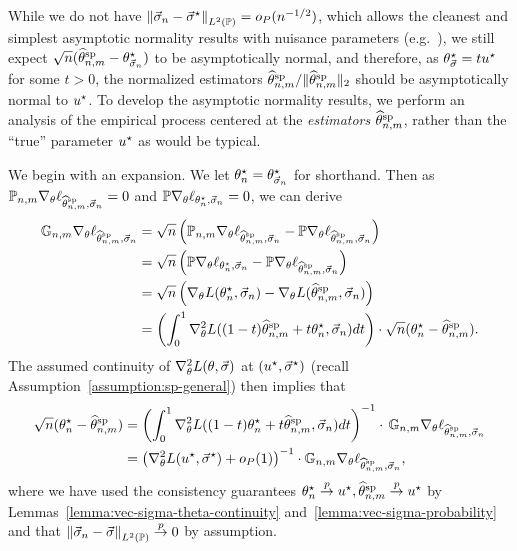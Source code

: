 While we do not have $\left\|{\vec{\sigma}_n - \vec{\sigma}^\star}\right\|_{L^2(\mathbb{P})} =
o_P(n^{-1/2})$, which allows the cleanest and simplest asymptotic normality
results with nuisance parameters
(e.g.~\cite[Thm.~25.54]{VanDerVaart98}), we still expect
$\sqrt{n}(\widehat{\theta}^{\textup{sp}}_{n,m} - \theta^\star_{\vec{\sigma}_n})$ to be asymptotically
normal, and therefore, as $\theta^\star_{\vec{\sigma}} = t u^\star$ for some
$t > 0$, the normalized estimators $\widehat{\theta}^{\textup{sp}}_{n,m} / \|{\widehat{\theta}^{\textup{sp}}_{n,m}}\|_2$
should be asymptotically normal to $u^\star$.
To develop the asymptotic normality results, we perform an analysis
of the empirical process centered at the \emph{estimators}
$\widehat{\theta}^{\textup{sp}}_{n,m}$, rather than the ``true'' parameter $u^\star$ as would
be typical.

We begin with an expansion. We let $\theta^\star_n =
\theta^\star_{\vec{\sigma}_n}$ for shorthand.
Then as $\mathbb{P}_{n,m} \nabla_\theta \ell_{\widehat{\theta}^{\textup{sp}}_{n,m},
	\vec{\sigma}_n} = 0$ and $\mathbb{P} \nabla_\theta \ell_{\theta^\star_n,
	\vec{\sigma}_n} = 0$, we can derive
\begin{align*}
	\mathbb{G}_{n,m} \nabla_\theta\ell_{\widehat{\theta}^{\textup{sp}}_{n,m}, \vec{\sigma}_n} & = \sqrt{n} \left({\mathbb{P}_{n,m} \nabla_\theta \ell_{\widehat{\theta}^{\textup{sp}}_{n,m}, \vec{\sigma}_n} - \mathbb{P} \nabla_\theta \ell_{\widehat{\theta}^{\textup{sp}}_{n,m}, \vec{\sigma}_n}}\right) \nonumber \\
	& = \sqrt{n} \left({\mathbb{P} \nabla_\theta\ell_{\theta^\star_n, \vec{\sigma}_n} - \mathbb{P} \nabla_\theta\ell_{\widehat{\theta}^{\textup{sp}}_{n,m}, \vec{\sigma}_n}}\right) \nonumber \\
	& = \sqrt{n} \left({\nabla_\theta L(\theta^\star_n, \vec{\sigma}_n) - \nabla_\theta L (\widehat{\theta}^{\textup{sp}}_{n,m}, \vec{\sigma}_n) }\right) \nonumber \\
	& = \left({\int_0^1 \nabla_{\theta}^2 L((1-t) \widehat{\theta}^{\textup{sp}}_{n,m} + t \theta^\star_n , \vec{\sigma}_n ) d t}\right) \cdot \sqrt{n}(\theta^\star_n - \widehat{\theta}^{\textup{sp}}_{n,m}).
\end{align*}
The assumed continuity of $\nabla_\theta^2 L(\theta, \vec{\sigma})$
at $(u^\star, \vec{\sigma}^\star)$ (recall
Assumption~\ref{assumption:sp-general}) then implies that
\begin{align}
	\sqrt{n}(\theta^\star_n - \widehat{\theta}^{\textup{sp}}_{n,m})
	& = \left({\int_0^1 \nabla_{\theta}^2 L((1-t) \theta^\star_n + t \widehat{\theta}^{\textup{sp}}_{n,m}, \vec{\sigma}_n ) d t}\right)^{-1}
	\cdot\, \mathbb{G}_{n,m} \nabla_\theta\ell_{\widehat{\theta}^{\textup{sp}}_{n,m}, \vec{\sigma}_n} \nonumber \\
	& =
	\left({\nabla_\theta^2 L(u^\star, \vec{\sigma}^\star)  + o_P(1)}\right)^{-1}
	\cdot \mathbb{G}_{n,m} \nabla_\theta \ell_{\widehat{\theta}^{\textup{sp}}_{n,m}, \vec{\sigma}_n},
	\label{eqn:sp-mle-mid-1}
\end{align}
where we have used the consistency guarantees $\theta^\star_n \stackrel{p}{\rightarrow} u^\star, \widehat{\theta}^{\textup{sp}}_{n,m}
\stackrel{p}{\rightarrow} u^\star$ by Lemmas~\ref{lemma:vec-sigma-theta-continuity}
and~\ref{lemma:vec-sigma-probability} and that $\left\|{\vec{\sigma}_n -
	\vec{\sigma}}\right\|_{L^2(\mathbb{P})} \stackrel{p}{\rightarrow} 0$ by assumption.


